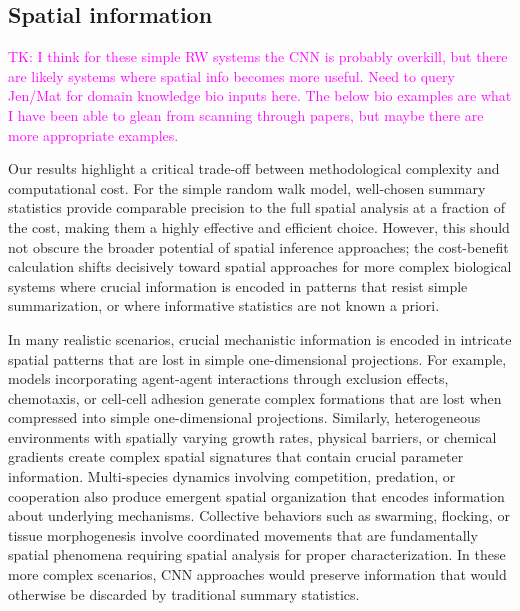\documentclass{article}
\begin{document}
\subsection{Spatial information}

\textcolor{magenta}{TK: I think for these simple RW systems the CNN is probably overkill, but there are likely systems where spatial info becomes more useful. Need to query Jen/Mat for domain knowledge bio inputs here. The below bio examples are what I have been able to glean from scanning through papers, but maybe there are more appropriate examples. }


Our results highlight a critical trade-off between methodological complexity and computational cost. For the simple random walk model, well-chosen summary statistics provide comparable precision to the full spatial analysis at a fraction of the cost, making them a highly effective and efficient choice. However, this should not obscure the broader potential of spatial inference approaches; the cost-benefit calculation shifts decisively toward spatial approaches for more complex biological systems where crucial information is encoded in patterns that resist simple summarization, or where informative statistics are not known a priori.


In many realistic scenarios, crucial mechanistic information is encoded in intricate spatial patterns that are lost in simple one-dimensional projections. For example, models incorporating agent-agent interactions through exclusion effects, chemotaxis, or cell-cell adhesion generate complex formations that are lost when compressed into simple one-dimensional projections. Similarly, heterogeneous environments with spatially varying growth rates, physical barriers, or chemical gradients create complex spatial signatures that contain crucial parameter information. Multi-species dynamics involving competition, predation, or cooperation also produce emergent spatial organization that encodes information about underlying mechanisms. Collective behaviors such as swarming, flocking, or tissue morphogenesis involve coordinated movements that are fundamentally spatial phenomena requiring spatial analysis for proper characterization. In these more complex scenarios, CNN approaches would preserve information that would otherwise be discarded by traditional summary statistics. 
\end{document}
